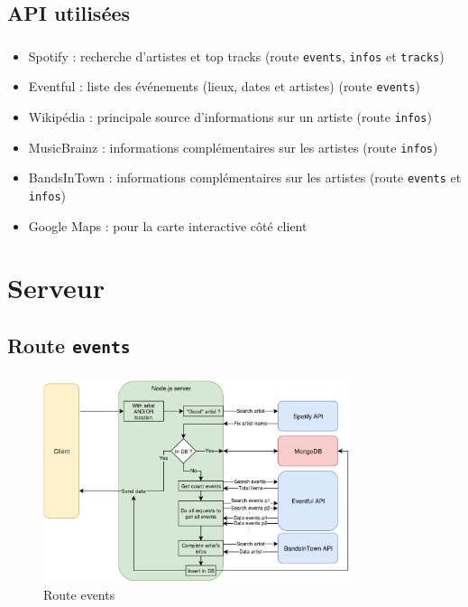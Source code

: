 \documentclass[10pt]{beamer}
\begin{document}
\subsection{API utilisées}
\begin{frame}
	\frametitle{\secname}
	\framesubtitle{\subsecname}
	\begin{itemize}
		\item Spotify : recherche d'artistes et top tracks (route \texttt{events}, \texttt{infos} et \texttt{tracks})
		\item Eventful : liste des événements (lieux, dates et artistes) (route \texttt{events})
		\item Wikipédia : principale source d'informations sur un artiste (route \texttt{infos})
        \item MusicBrainz : informations complémentaires sur les artistes (route \texttt{infos})
		\item BandsInTown : informations complémentaires sur les artistes (route \texttt{events} et \texttt{infos})
		\item Google Maps : pour la carte interactive côté client
	\end{itemize}
\end{frame}

\section{Serveur}

\subsection{Route \texttt{events}}
\begin{frame}
	\frametitle{\secname}
	\framesubtitle{\subsecname}
	\begin{figure}
		\begin{center}
			\includegraphics[width=0.8\textwidth]{images/events.png}
		\end{center}
		\caption{Route events}
	\end{figure}
\end{frame}
\end{document}
